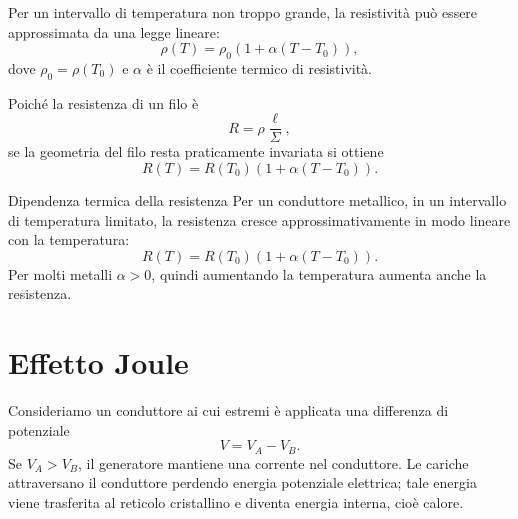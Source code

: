 \documentclass[a4paper]{article}
\begin{document}
Per un intervallo di temperatura non troppo grande, la resistività può essere approssimata da una legge lineare:
\[
    \rho(T)=\rho_0\left(1+\alpha(T-T_0)\right),
\]
dove \(\rho_0=\rho(T_0)\) e \(\alpha\) è il coefficiente termico di resistività.

Poiché la resistenza di un filo è
\[
    R=\rho\frac{\ell}{\Sigma},
\]
se la geometria del filo resta praticamente invariata si ottiene
\[
    R(T)=R(T_0)\left(1+\alpha(T-T_0)\right).
\]

\begin{snippetproposition}{Dipendenza termica della resistenza}
    Per un conduttore metallico, in un intervallo di temperatura limitato, la resistenza cresce approssimativamente in modo lineare con la temperatura:
    \[
        R(T)=R(T_0)\left(1+\alpha(T-T_0)\right).
    \]
    Per molti metalli \(\alpha>0\), quindi aumentando la temperatura aumenta anche la resistenza.
\end{snippetproposition}

\begin{center}
\end{center}

\section{Effetto Joule}

Consideriamo un conduttore ai cui estremi è applicata una differenza di potenziale
\[
    V=V_A-V_B.
\]
Se \(V_A>V_B\), il generatore mantiene una corrente nel conduttore. Le cariche attraversano il conduttore perdendo energia potenziale elettrica; tale energia viene trasferita al reticolo cristallino e diventa energia interna, cioè calore.

\begin{center}
\end{center}
\end{document}
